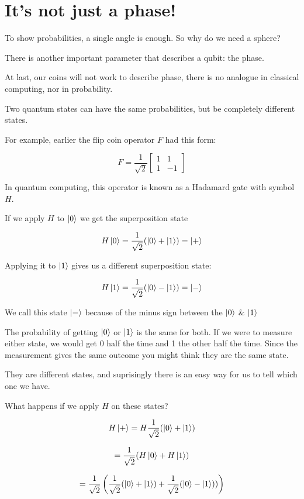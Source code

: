 \documentclass{book}
\begin{document}
\hline

\section{It's not just a phase!} 

To show probabilities, a single angle is enough. So why do we need a sphere? 

There is another important parameter that describes a qubit: the phase. 

At last, our coins will not work to describe phase, there is no analogue in classical computing, nor in probability.

Two quantum states can have the same probabilities, but be completely different states.

For example, earlier the flip coin operator $F$ had this form:

$$
F =  \frac{1}{\sqrt{2}} \begin{bmatrix} 1 & 1 \\ 1 & -1 \end{bmatrix}
$$

In quantum computing, this operator is known as a Hadamard gate with symbol $H$. 

If we apply $H$ to $\ket{0}$ we get the superposition state 

$$
H\ket{0} = \frac{1}{\sqrt{2}} ( \ket{0} + \ket{1}) = \ket{+}
$$

Applying it to $\ket{1}$ gives us a different superposition state: 

$$
H\ket{1} = \frac{1}{\sqrt{2}} ( \ket{0} - \ket{1}) = \ket{-}
$$

We call this state $\ket{-}$ because of the minus sign between the $\ket{0}$ \& $\ket{1}$

The probability of getting $\ket{0}$ or $\ket{1}$ is the same for both. If we were to measure either state, we would get 0 half the time and 1 the other half the time. Since the measurement gives the same outcome you might think they are the same state. 
 
They are different states, and suprisingly there is an easy way for us to tell which one we have. 

What happens if we apply $H$ on these states? 

$$ H\ket{+} = H \frac{1}{\sqrt{2}} ( \ket{0} + \ket{1})$$

$$= \frac{1}{\sqrt{2}} (H\ket{0} + H\ket{1})$$

$$ = \frac{1}{\sqrt{2}}\left( \frac{1}{\sqrt{2}}(\ket{0} + \ket{1})+\frac{1}{\sqrt{2}}(\ket{0} - \ket{1}))  \right)$$
\end{document}

